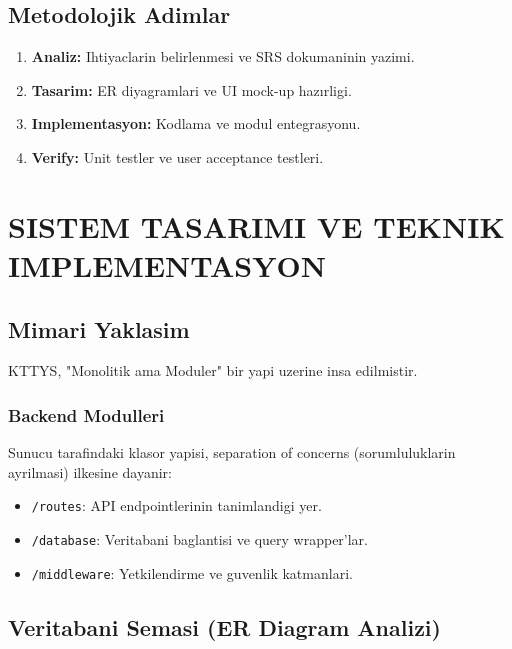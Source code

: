 \documentclass[12pt,a4paper,oneside]{report}
\begin{document}
\section{Metodolojik Adimlar}

\begin{enumerate}
    \item \textbf{Analiz:} Ihtiyaclarin belirlenmesi ve SRS dokumaninin yazimi.
    \item \textbf{Tasarim:} ER diyagramlari ve UI mock-up hazırligi.
    \item \textbf{Implementasyon:} Kodlama ve modul entegrasyonu.
    \item \textbf{Verify:} Unit testler ve user acceptance testleri.
\end{enumerate}

\chapter{SISTEM TASARIMI VE TEKNIK IMPLEMENTASYON}
\label{chap:tasarim}

\section{Mimari Yaklasim}

KTTYS, "Monolitik ama Moduler" bir yapi uzerine insa edilmistir.

\subsection{Backend Modulleri}
Sunucu tarafindaki klasor yapisi, separation of concerns (sorumluluklarin ayrilmasi) ilkesine dayanir:
\begin{itemize}
    \item \texttt{/routes}: API endpointlerinin tanimlandigi yer.
    \item \texttt{/database}: Veritabani baglantisi ve query wrapper'lar.
    \item \texttt{/middleware}: Yetkilendirme ve guvenlik katmanlari.
\end{itemize}

\section{Veritabani Semasi (ER Diagram Analizi)}
\end{document}
